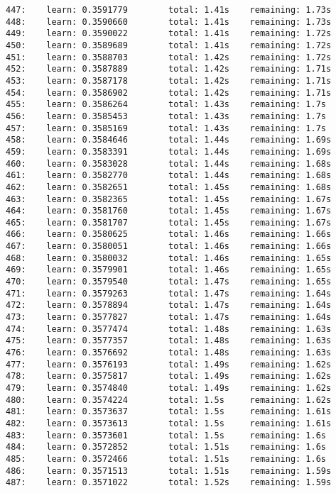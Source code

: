 \documentclass[11pt]{article}
\begin{document}
\begin{Verbatim}[commandchars=\\\{\}]
447:    learn: 0.3591779        total: 1.41s    remaining: 1.73s
448:    learn: 0.3590660        total: 1.41s    remaining: 1.73s
449:    learn: 0.3590022        total: 1.41s    remaining: 1.72s
450:    learn: 0.3589689        total: 1.41s    remaining: 1.72s
451:    learn: 0.3588703        total: 1.42s    remaining: 1.72s
452:    learn: 0.3587889        total: 1.42s    remaining: 1.71s
453:    learn: 0.3587178        total: 1.42s    remaining: 1.71s
454:    learn: 0.3586902        total: 1.42s    remaining: 1.71s
455:    learn: 0.3586264        total: 1.43s    remaining: 1.7s
456:    learn: 0.3585453        total: 1.43s    remaining: 1.7s
457:    learn: 0.3585169        total: 1.43s    remaining: 1.7s
458:    learn: 0.3584646        total: 1.44s    remaining: 1.69s
459:    learn: 0.3583391        total: 1.44s    remaining: 1.69s
460:    learn: 0.3583028        total: 1.44s    remaining: 1.68s
461:    learn: 0.3582770        total: 1.44s    remaining: 1.68s
462:    learn: 0.3582651        total: 1.45s    remaining: 1.68s
463:    learn: 0.3582365        total: 1.45s    remaining: 1.67s
464:    learn: 0.3581760        total: 1.45s    remaining: 1.67s
465:    learn: 0.3581707        total: 1.45s    remaining: 1.67s
466:    learn: 0.3580625        total: 1.46s    remaining: 1.66s
467:    learn: 0.3580051        total: 1.46s    remaining: 1.66s
468:    learn: 0.3580032        total: 1.46s    remaining: 1.65s
469:    learn: 0.3579901        total: 1.46s    remaining: 1.65s
470:    learn: 0.3579540        total: 1.47s    remaining: 1.65s
471:    learn: 0.3579263        total: 1.47s    remaining: 1.64s
472:    learn: 0.3578894        total: 1.47s    remaining: 1.64s
473:    learn: 0.3577827        total: 1.47s    remaining: 1.64s
474:    learn: 0.3577474        total: 1.48s    remaining: 1.63s
475:    learn: 0.3577357        total: 1.48s    remaining: 1.63s
476:    learn: 0.3576692        total: 1.48s    remaining: 1.63s
477:    learn: 0.3576193        total: 1.49s    remaining: 1.62s
478:    learn: 0.3575817        total: 1.49s    remaining: 1.62s
479:    learn: 0.3574840        total: 1.49s    remaining: 1.62s
480:    learn: 0.3574224        total: 1.5s     remaining: 1.62s
481:    learn: 0.3573637        total: 1.5s     remaining: 1.61s
482:    learn: 0.3573613        total: 1.5s     remaining: 1.61s
483:    learn: 0.3573601        total: 1.5s     remaining: 1.6s
484:    learn: 0.3572852        total: 1.51s    remaining: 1.6s
485:    learn: 0.3572466        total: 1.51s    remaining: 1.6s
486:    learn: 0.3571513        total: 1.51s    remaining: 1.59s
487:    learn: 0.3571022        total: 1.52s    remaining: 1.59s

\end{Verbatim}
\end{document}
